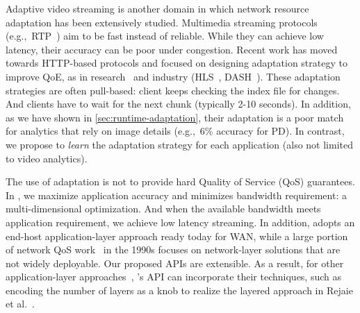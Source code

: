 \documentclass[thesis.tex]{subfiles}
\begin{document}
Adaptive video streaming is another domain in which network resource adaptation
has been extensively studied. Multimedia streaming protocols
(e.g.,~RTP~\cite{schulzrinne2006rtp}) aim to be fast instead of reliable. While
they can achieve low latency, their accuracy can be poor under congestion.
Recent work has moved towards HTTP-based protocols and focused on designing
adaptation strategy to improve QoE, as in research~\cite{mao2017neural,
  sun2016cs2p, yin2015control} and industry (HLS~\cite{pantos2016http},
DASH~\cite{michalos2012dynamic, sodagar2011mpeg}). These adaptation strategies
are often pull-based: client keeps checking the index file for changes. And
clients have to wait for the next chunk (typically 2-10 seconds). In addition,
as we have shown in \autoref{sec:runtime-adaptation}, their adaptation is a poor
match for analytics that rely on image details (e.g.,~6\% accuracy for PD). In
contrast, we propose to \emph{learn} the adaptation strategy for each
application (also not limited to video analytics).

The use of adaptation is not to provide hard Quality of Service (QoS)
guarantees. In \awstream{}, we maximize application accuracy and minimizes
bandwidth requirement: a multi-dimensional optimization. And when the available
bandwidth meets application requirement, we achieve low latency streaming.  In
addition, \awstream{} adopts an end-host application-layer approach ready today
for WAN, while a large portion of network QoS work~\cite{ferrari1990scheme,
  shenker1994integrated, shenker1995fundamental} in the 1990s focuses on
network-layer solutions that are not widely deployable. Our proposed APIs are
extensible. As a result, for other application-layer
approaches~\cite{vandalore2001survey}, \awstream{}'s API can incorporate their
techniques, such as encoding the number of layers as a knob to realize the
layered approach in Rejaie et al.~\cite{rejaie2000layered}.


\end{document}
